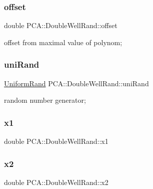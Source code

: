 \subsubsection{\texorpdfstring{offset}{offset}}
{\footnotesize\ttfamily double P\+C\+A\+::\+Double\+Well\+Rand\+::offset\hspace{0.3cm}{\ttfamily [private]}}



offset from maximal value of polynom; 

\hypertarget{class_p_c_a_1_1_double_well_rand_a44577274c594e30092748eb446d8dd40}{}\label{class_p_c_a_1_1_double_well_rand_a44577274c594e30092748eb446d8dd40} 
\subsubsection{\texorpdfstring{uni\+Rand}{uniRand}}
{\footnotesize\ttfamily \hyperlink{class_p_c_a_1_1_uniform_rand}{Uniform\+Rand} P\+C\+A\+::\+Double\+Well\+Rand\+::uni\+Rand\hspace{0.3cm}{\ttfamily [private]}}



random number generator; 

\hypertarget{class_p_c_a_1_1_double_well_rand_ab624775bcfb6b575ae1aa099bcd78cd7}{}\label{class_p_c_a_1_1_double_well_rand_ab624775bcfb6b575ae1aa099bcd78cd7} 
\subsubsection{\texorpdfstring{x1}{x1}}
{\footnotesize\ttfamily double P\+C\+A\+::\+Double\+Well\+Rand\+::x1\hspace{0.3cm}{\ttfamily [private]}}

\hypertarget{class_p_c_a_1_1_double_well_rand_a116879814f1ddd7bfc1efc3c11bf8c5b}{}\label{class_p_c_a_1_1_double_well_rand_a116879814f1ddd7bfc1efc3c11bf8c5b} 
\subsubsection{\texorpdfstring{x2}{x2}}
{\footnotesize\ttfamily double P\+C\+A\+::\+Double\+Well\+Rand\+::x2\hspace{0.3cm}{\ttfamily [private]}}

